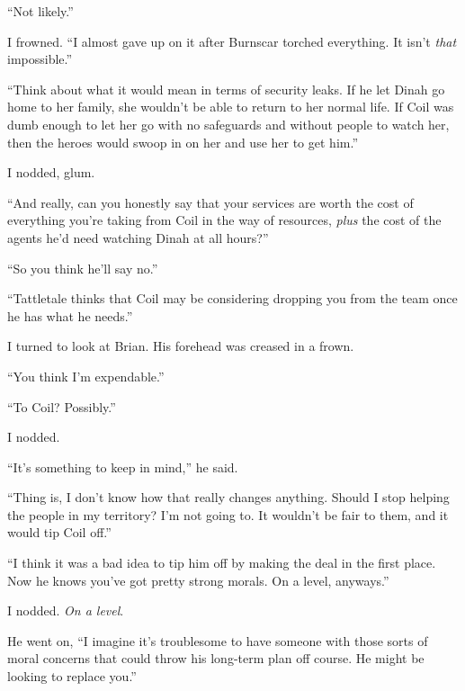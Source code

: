 ``Not likely.''



I frowned.  ``I almost gave up on it after Burnscar torched everything.  It isn't \emph{that} impossible.''



``Think about what it would mean in terms of security leaks.  If he let Dinah go home to her family, she wouldn't be able to return to her normal life.  If Coil was dumb enough to let her go with no safeguards and without people to watch her, then the heroes would swoop in on her and use her to get him.''



I nodded, glum.



``And really, can you honestly say that your services are worth the cost of everything you're taking from Coil in the way of resources, \emph{plus} the cost of the agents he'd need watching Dinah at all hours?''



``So you think he'll say no.''



``Tattletale thinks that Coil may be considering dropping you from the team once he has what he needs.''



I turned to look at Brian.  His forehead was creased in a frown.



``You think I'm expendable.''



``To Coil?  Possibly.''



I nodded.



``It's something to keep in mind,'' he said.



``Thing is, I don't know how that really changes anything.  Should I stop helping the people in my territory?  I'm not going to.  It wouldn't be fair to them, and it would tip Coil off.''



``I think it was a bad idea to tip him off by making the deal in the first place.  Now he knows you've got pretty strong morals.  On a level, anyways.''



I nodded.  \emph{On a level}.



He went on, ``I imagine it's troublesome to have someone with those sorts of moral concerns that could throw his long-term plan off course.  He might be looking to replace you.''



